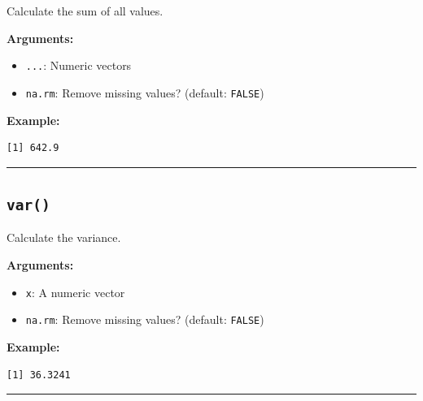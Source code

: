 \documentclass[
  letterpaper,
  DIV=11,
  numbers=noendperiod]{scrreprt}
\newenvironment{Shaded}{\begin{snugshade}}{\end{snugshade}}
\newcommand{\FunctionTok}[1]{\textcolor[rgb]{0.28,0.35,0.67}{#1}}
\newcommand{\NormalTok}[1]{\textcolor[rgb]{0.00,0.23,0.31}{#1}}
\newcommand{\SpecialCharTok}[1]{\textcolor[rgb]{0.37,0.37,0.37}{#1}}
\providecommand{\tightlist}{%
  \setlength{\itemsep}{0pt}\setlength{\parskip}{0pt}}
\begin{document}
Calculate the sum of all values.

\textbf{Arguments:}

\begin{itemize}
\tightlist
\item
  \texttt{...}: Numeric vectors
\item
  \texttt{na.rm}: Remove missing values? (default: \texttt{FALSE})
\end{itemize}

\textbf{Example:}

\begin{Shaded}
\end{Shaded}

\begin{verbatim}
[1] 642.9
\end{verbatim}

\begin{center}\rule{0.5\linewidth}{0.5pt}\end{center}

\subsection{\texorpdfstring{\texttt{var()}}{var()}}\label{var}

Calculate the variance.

\textbf{Arguments:}

\begin{itemize}
\tightlist
\item
  \texttt{x}: A numeric vector
\item
  \texttt{na.rm}: Remove missing values? (default: \texttt{FALSE})
\end{itemize}

\textbf{Example:}

\begin{Shaded}
\end{Shaded}

\begin{verbatim}
[1] 36.3241
\end{verbatim}

\begin{center}\rule{0.5\linewidth}{0.5pt}\end{center}
\end{document}
